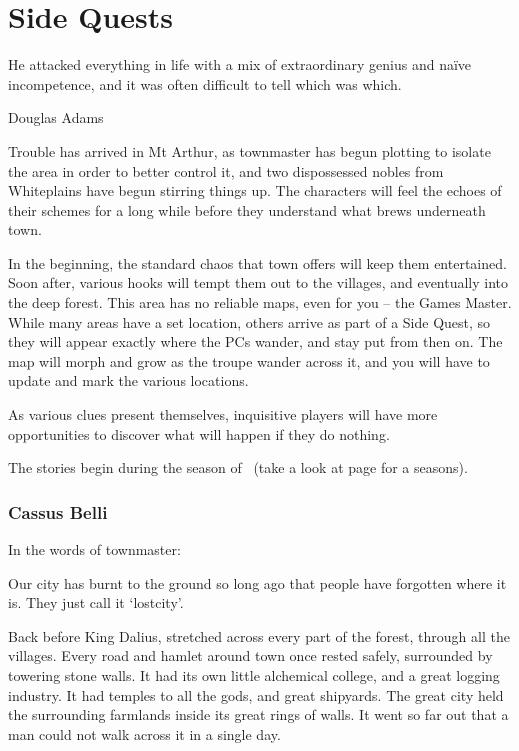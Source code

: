 \chapter{Side Quests}
  \epigraph{He attacked everything in life with a mix of extraordinary genius and na\"ive incompetence, and it was often difficult to tell which was which.}{Douglas Adams}

\begin{multicols}{2}

\noindent
Trouble has arrived in Mt Arthur, as \gls{townmaster} has begun plotting to isolate the area in order to better control it, and two dispossessed nobles from Whiteplains have begun stirring things up.
The characters will feel the echoes of their schemes for a long while before they understand what brews underneath \gls{town}.

In the beginning, the standard chaos that \gls{town} offers will keep them entertained.
Soon after, various hooks will tempt them out to the villages, and eventually into the deep forest.
This area has no reliable maps, even for you -- the Games Master.
While many areas have a set location, others arrive as part of a Side Quest, so they will appear exactly where the PCs wander, and stay put from then on.
The map will morph and grow as the troupe wander across it, and you will have to update and mark the various locations.

As various clues present themselves, inquisitive players will have more opportunities to discover what will happen if they do nothing.

The stories begin during the season of \season\ (take a look at page \pageref{astronomy} for a seasons).

\subsection{Cassus Belli}
\label{expanding_wilderness}

In the words of \gls{townmaster}:

\begin{exampletext}

  Our city has burnt to the ground so long ago that people have forgotten where it is.
  They just call it `\gls{lostcity}'.

  Back before King Dalius,  stretched across every part of the forest, through all the villages.
  Every road and hamlet around \gls{town} once rested safely, surrounded by towering stone walls.
  It had its own little alchemical college, and a great logging industry.
  It had temples to all the gods, and great shipyards.
  The great city held the surrounding farmlands inside its great rings of walls.
  It went so far out that a man could not walk across it in a single day.


\end{exampletext}
\end{multicols}

